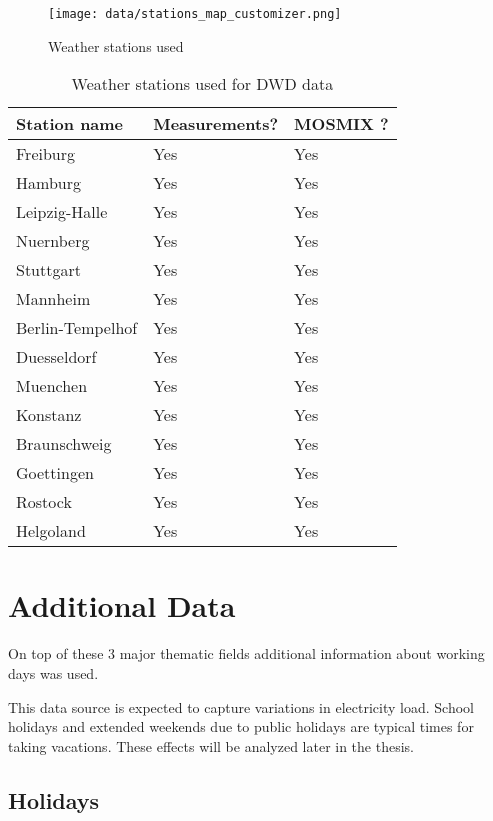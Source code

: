 \documentclass[class=scrbook, crop=false]{standalone}
\begin{document}
\begin{figure}[ht]
            \centering
            \texttt{[image: data/stations\_map\_customizer.png]}
            \caption[Weather stations used]{Weather stations used}
            \label{fig::weather_stations}
 \end{figure}
 

\begin{table}[]
\begin{tabular}{l|l|l}
Station name & Measurements? & MOSMIX ?\\\hline
   Freiburg&Yes&Yes\\
   Hamburg&Yes&Yes\\
    Leipzig-Halle&Yes&Yes\\
    Nuernberg&Yes&Yes\\
    Stuttgart&Yes&Yes\\
    Mannheim&Yes&Yes\\
    Berlin-Tempelhof&Yes&Yes\\
    Duesseldorf&Yes&Yes\\
    Muenchen&Yes&Yes\\
   Konstanz&Yes&Yes\\
   Braunschweig&Yes&Yes\\
   Goettingen&Yes&Yes\\
   Rostock&Yes&Yes\\
   Helgoland&Yes&Yes   
\end{tabular}
\caption{Weather stations used for DWD data}
\label{Table::Weather_Stations}
\end{table}



 
 

\section{Additional Data}
\label{Section::Additional_Data}
On top of these 3 major thematic fields additional information about working days was used. 

This data source is expected to capture variations in electricity load.
School holidays and extended weekends due to public holidays are typical times for taking vacations.
These effects will be analyzed later in the thesis.

\subsection{Holidays}
\end{document}
